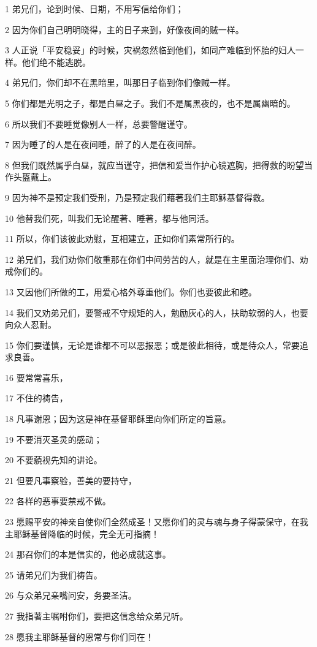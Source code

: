 \par 1 弟兄们，论到时候、日期，不用写信给你们；
\par 2 因为你们自己明明晓得，主的日子来到，好像夜间的贼一样。
\par 3 人正说「平安稳妥」的时候，灾祸忽然临到他们，如同产难临到怀胎的妇人一样。他们绝不能逃脱。
\par 4 弟兄们，你们却不在黑暗里，叫那日子临到你们像贼一样。
\par 5 你们都是光明之子，都是白昼之子。我们不是属黑夜的，也不是属幽暗的。
\par 6 所以我们不要睡觉像别人一样，总要警醒谨守。
\par 7 因为睡了的人是在夜间睡，醉了的人是在夜间醉。
\par 8 但我们既然属乎白昼，就应当谨守，把信和爱当作护心镜遮胸，把得救的盼望当作头盔戴上。
\par 9 因为神不是预定我们受刑，乃是预定我们藉著我们主耶稣基督得救。
\par 10 他替我们死，叫我们无论醒著、睡著，都与他同活。
\par 11 所以，你们该彼此劝慰，互相建立，正如你们素常所行的。
\par 12 弟兄们，我们劝你们敬重那在你们中间劳苦的人，就是在主里面治理你们、劝戒你们的。
\par 13 又因他们所做的工，用爱心格外尊重他们。你们也要彼此和睦。
\par 14 我们又劝弟兄们，要警戒不守规矩的人，勉励灰心的人，扶助软弱的人，也要向众人忍耐。
\par 15 你们要谨慎，无论是谁都不可以恶报恶；或是彼此相待，或是待众人，常要追求良善。
\par 16 要常常喜乐，
\par 17 不住的祷告，
\par 18 凡事谢恩；因为这是神在基督耶稣里向你们所定的旨意。
\par 19 不要消灭圣灵的感动；
\par 20 不要藐视先知的讲论。
\par 21 但要凡事察验，善美的要持守，
\par 22 各样的恶事要禁戒不做。
\par 23 愿赐平安的神亲自使你们全然成圣！又愿你们的灵与魂与身子得蒙保守，在我主耶稣基督降临的时候，完全无可指摘！
\par 24 那召你们的本是信实的，他必成就这事。
\par 25 请弟兄们为我们祷告。
\par 26 与众弟兄亲嘴问安，务要圣洁。
\par 27 我指著主嘱咐你们，要把这信念给众弟兄听。
\par 28 愿我主耶稣基督的恩常与你们同在！


